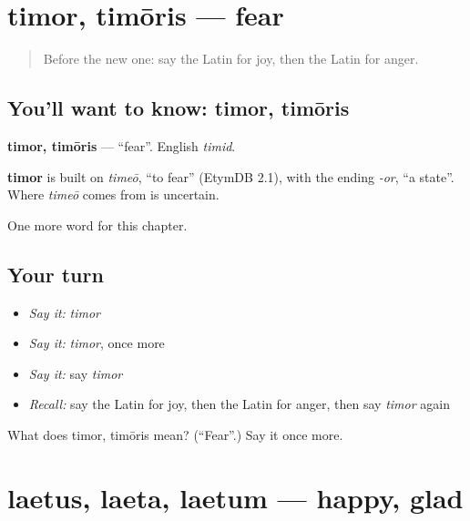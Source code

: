 \section[timor, timōris]{timor, timōris — fear}

\label{lesson:LA-C69-timor}



\begin{quote}
Before the new one: say the Latin for joy, then the Latin for anger.
\end{quote}

\subsection*{You'll want to know: timor, timōris}
\textbf{timor, timōris} — \textquotedblleft{}fear\textquotedblright{}. English \emph{timid}.

\begin{cousinweb}
\textbf{timor} is built on \emph{timeō}, \textquotedblleft{}to fear\textquotedblright{} (EtymDB 2.1), with the ending \emph{-or}, \textquotedblleft{}a state\textquotedblright{}. Where \emph{timeō} comes from is uncertain.
\end{cousinweb}

\begin{grammarlens}[title={What you've built}]
One more word for this chapter.
\end{grammarlens}

\subsection*{Your turn}
\begin{itemize}
\raggedright
  \item \emph{Say it:} \emph{timor}
  \item \emph{Say it:} \emph{timor}, once more
  \item \emph{Say it:} say \emph{timor}
  \item \emph{Recall:} say the Latin for joy, then the Latin for anger, then say \emph{timor} again
\end{itemize}

\begin{tcolorbox}[breakable,colback=teal!4,colframe=teal!35!black,title={Before you move on}]
What does timor, timōris mean? (\textquotedblleft{}Fear\textquotedblright{}.) Say it once more.
\end{tcolorbox}
\section[laetus, laeta, laetum]{laetus, laeta, laetum — happy, glad}

